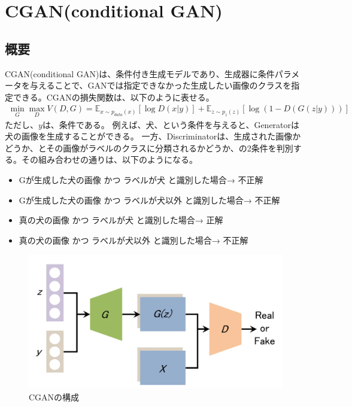 \documentclass{ltjsarticle}
\begin{document}
\clearpage
\section{CGAN(conditional GAN)}
\subsection{概要}
CGAN(conditional GAN)は、条件付き生成モデルであり、生成器に条件パラメータを与えることで、GANでは指定できなかった生成したい画像のクラスを指定できる。CGANの損失関数は、以下のように表せる。
\begin{align}
  \min_G \max_D V(D, G) = \mathbb{E}_{x \sim p_{data}(x)}[\log D(x|y)] + \mathbb{E}_{z \sim p_z(z)}[\log(1 - D(G(z|y)))]
\end{align}
ただし、$y$は、条件である。
例えば、犬、という条件を与えると、Generatorは犬の画像を生成することができる。
一方、Discriminatorは、生成された画像かどうか、とその画像がラベルのクラスに分類されるかどうか、の2条件を判別する。その組み合わせの通りは、以下のようになる。
\begin{itemize}
  \item Gが生成した犬の画像 かつ ラベルが犬 と識別した場合→ 不正解
  \item Gが生成した犬の画像 かつ ラベルが犬以外 と識別した場合→ 不正解
  \item 真の犬の画像 かつ ラベルが犬 と識別した場合→ 正解
  \item 真の犬の画像 かつ ラベルが犬以外 と識別した場合→ 不正解
\end{itemize}
\begin{figure}[htbp]
  \centering
  \includegraphics[width=13cm]{./capture/CGAN.png}
  \caption{CGANの構成}
  \label{fig:conditional_GAN}
\end{figure}
\end{document}
